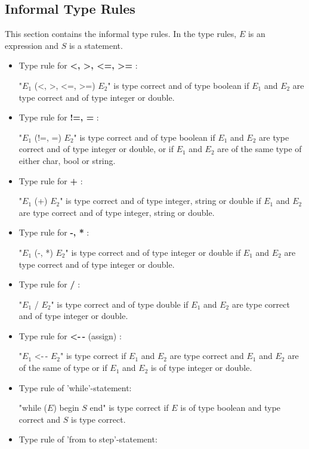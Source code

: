 \subsection{Informal Type Rules}
This section contains the informal type rules. In the type rules, $E$ is an expression and $S$ is a statement.
\begin{itemize}
\item Type rule for \textbf{<, >, <=, >=} :

"$E_1$ (<, >, <=, >=) $E_2$" is type correct and of type boolean if $E_1$ and $E_2$ are type correct and of type integer or double.

\item Type rule for \textbf{!=, =} :

"$E_1$ (!=, =) $E_2$" is type correct and of type boolean if $E_1$ and $E_2$ are type correct and of type integer or double, or if $E_1$ and $E_2$ are of the same type of either char, bool or string.

\item Type rule for \textbf{+} :

"$E_1$ (+) $E_2$" is type correct and of type integer, string or double if $E_1$ and $E_2$ are type correct and of type integer, string or double.

\item Type rule for \textbf{-, *} :

"$E_1$ (-, *) $E_2$" is type correct and of type integer or double if $E_1$ and $E_2$ are type correct and of type integer or double.


\item Type rule for \textbf{/} :

"$E_1$ / $E_2$" is type correct and of type double if $E_1$ and $E_2$ are type correct and of type integer or double.

\item Type rule for \textbf{<-\,-} (assign) :

"$E_1$ <-\,- $E_2$" is type correct if $E_1$ and $E_2$ are type correct and $E_1$ and $E_2$ are of the same of type or if $E_1$ and $E_2$ is of type integer or double.

\item Type rule of 'while'-statement: 

"while ($E$) begin $S$ end" is type correct if $E$ is of type boolean and type correct and $S$ is type correct.

\item Type rule of 'from to step'-statement: 


\end{itemize}
